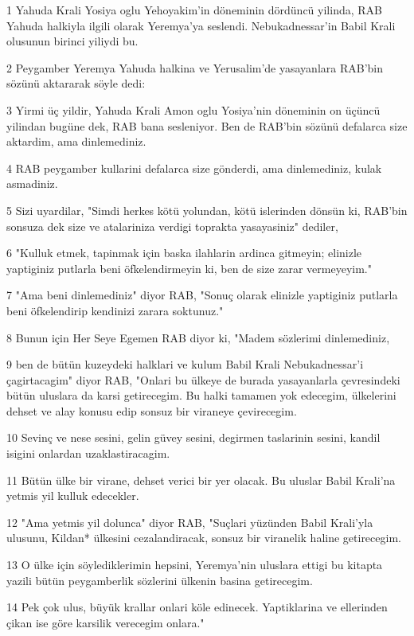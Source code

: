 \par 1 Yahuda Krali Yosiya oglu Yehoyakim'in döneminin dördüncü yilinda, RAB Yahuda halkiyla ilgili olarak Yeremya'ya seslendi. Nebukadnessar'in Babil Krali olusunun birinci yiliydi bu.
\par 2 Peygamber Yeremya Yahuda halkina ve Yerusalim'de yasayanlara RAB'bin sözünü aktararak söyle dedi:
\par 3 Yirmi üç yildir, Yahuda Krali Amon oglu Yosiya'nin döneminin on üçüncü yilindan bugüne dek, RAB bana sesleniyor. Ben de RAB'bin sözünü defalarca size aktardim, ama dinlemediniz.
\par 4 RAB peygamber kullarini defalarca size gönderdi, ama dinlemediniz, kulak asmadiniz.
\par 5 Sizi uyardilar, "Simdi herkes kötü yolundan, kötü islerinden dönsün ki, RAB'bin sonsuza dek size ve atalariniza verdigi toprakta yasayasiniz" dediler,
\par 6 "Kulluk etmek, tapinmak için baska ilahlarin ardinca gitmeyin; elinizle yaptiginiz putlarla beni öfkelendirmeyin ki, ben de size zarar vermeyeyim."
\par 7 "Ama beni dinlemediniz" diyor RAB, "Sonuç olarak elinizle yaptiginiz putlarla beni öfkelendirip kendinizi zarara soktunuz."
\par 8 Bunun için Her Seye Egemen RAB diyor ki, "Madem sözlerimi dinlemediniz,
\par 9 ben de bütün kuzeydeki halklari ve kulum Babil Krali Nebukadnessar'i çagirtacagim" diyor RAB, "Onlari bu ülkeye de burada yasayanlarla çevresindeki bütün uluslara da karsi getirecegim. Bu halki tamamen yok edecegim, ülkelerini dehset ve alay konusu edip sonsuz bir viraneye çevirecegim.
\par 10 Sevinç ve nese sesini, gelin güvey sesini, degirmen taslarinin sesini, kandil isigini onlardan uzaklastiracagim.
\par 11 Bütün ülke bir virane, dehset verici bir yer olacak. Bu uluslar Babil Krali'na yetmis yil kulluk edecekler.
\par 12 "Ama yetmis yil dolunca" diyor RAB, "Suçlari yüzünden Babil Krali'yla ulusunu, Kildan* ülkesini cezalandiracak, sonsuz bir viranelik haline getirecegim.
\par 13 O ülke için söylediklerimin hepsini, Yeremya'nin uluslara ettigi bu kitapta yazili bütün peygamberlik sözlerini ülkenin basina getirecegim.
\par 14 Pek çok ulus, büyük krallar onlari köle edinecek. Yaptiklarina ve ellerinden çikan ise göre karsilik verecegim onlara."
